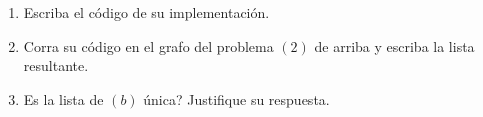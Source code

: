 \documentclass[12pt, a4paper]{article}
\begin{document}
\begin{enumerate}
\begin{enumerate}
\item Escriba el c\'odigo de su implementaci\'on.
\item Corra su c\'odigo en el grafo del problema $(2)$ de arriba y escriba la lista resultante.
\item Es la lista de $(b)$ \'unica? Justifique su respuesta.
\end{enumerate}

\end{enumerate}
\end{document}
